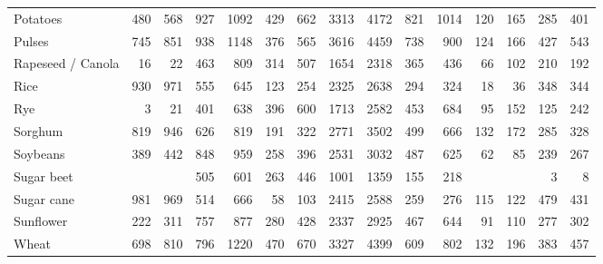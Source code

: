 \begin{tabular}{lrrrrrrrrrrrrrr}
Potatoes & 480 & 568 & 927 & 1092 & 429 & 662 & 3313 & 4172 & 821 & 1014 & 120 & 165 & 285 & 401 \\
Pulses & 745 & 851 & 938 & 1148 & 376 & 565 & 3616 & 4459 & 738 & 900 & 124 & 166 & 427 & 543 \\
Rapeseed / Canola & 16 & 22 & 463 & 809 & 314 & 507 & 1654 & 2318 & 365 & 436 & 66 & 102 & 210 & 192 \\
Rice & 930 & 971 & 555 & 645 & 123 & 254 & 2325 & 2638 & 294 & 324 & 18 & 36 & 348 & 344 \\
Rye & 3 & 21 & 401 & 638 & 396 & 600 & 1713 & 2582 & 453 & 684 & 95 & 152 & 125 & 242 \\
Sorghum & 819 & 946 & 626 & 819 & 191 & 322 & 2771 & 3502 & 499 & 666 & 132 & 172 & 285 & 328 \\
Soybeans & 389 & 442 & 848 & 959 & 258 & 396 & 2531 & 3032 & 487 & 625 & 62 & 85 & 239 & 267 \\
Sugar beet &  &  & 505 & 601 & 263 & 446 & 1001 & 1359 & 155 & 218 &  &  & 3 & 8 \\
Sugar cane & 981 & 969 & 514 & 666 & 58 & 103 & 2415 & 2588 & 259 & 276 & 115 & 122 & 479 & 431 \\
Sunflower & 222 & 311 & 757 & 877 & 280 & 428 & 2337 & 2925 & 467 & 644 & 91 & 110 & 277 & 302 \\
Wheat & 698 & 810 & 796 & 1220 & 470 & 670 & 3327 & 4399 & 609 & 802 & 132 & 196 & 383 & 457 \\
\bottomrule
\end{tabular}
